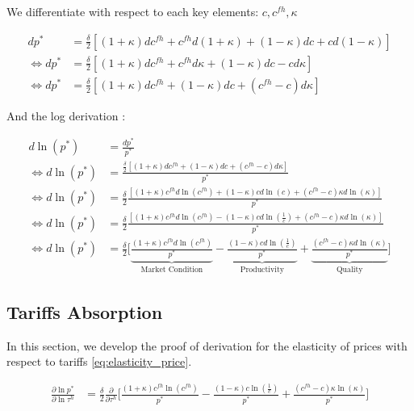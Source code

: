 We differentiate with respect to each key elements: $c, c^{fh}, \kappa$

\begin{align*}
    d p^* &= \frac{\delta}{2}[(1 + \kappa)dc^{fh} + c^{fh}d(1 + \kappa) + (1 - \kappa)dc + cd(1 - \kappa)] \\
    \Longleftrightarrow d p^* &= \frac{\delta}{2}[(1 + \kappa)dc^{fh} + c^{fh}d\kappa + (1 - \kappa)dc - cd\kappa]\\
    \Longleftrightarrow d p^* &= \frac{\delta}{2}[(1 + \kappa)dc^{fh} + (1 - \kappa)dc  + (c^{fh} - c)d\kappa]
\end{align*}

And the log derivation :

\begin{align*}
    d \ln(p^*) &=\frac{dp^*}{p^*} \\
    \Longleftrightarrow d \ln(p^*) &= \frac{\frac{\delta}{2} [(1 + \kappa)dc^{fh} + (1 - \kappa)dc  + (c^{fh} - c)d\kappa]}{p^*} \\
    \Longleftrightarrow d \ln(p^*) &= \frac{\delta}{2}\frac{[(1 + \kappa)c^{fh}d\ln(c^{fh}) + (1 - \kappa)cd\ln(c)  + (c^{fh} - c)\kappa d\ln(\kappa)]}{p^*} \\
    \Longleftrightarrow d \ln(p^*) &= \frac{\delta}{2}\frac{[(1 + \kappa)c^{fh}d\ln(c^{fh}) - (1 - \kappa)cd\ln(\frac{1}{c})  + (c^{fh} - c)\kappa d\ln(\kappa)]}{p^*} \\
     \Longleftrightarrow d \ln(p^*) &= \frac{\delta}{2} \bigg[\underbrace{\frac{(1 + \kappa)c^{fh}d\ln(c^{fh})}{p^*}}_{\text{Market Condition}} - \underbrace{\frac{(1 - \kappa)c d\ln(\frac{1}{c})}{p^*}}_{\text{Productivity}} + \underbrace{\frac{(c^{fh} - c)\kappa d\ln(\kappa)}{p^*}}_{\text{Quality}}\bigg]
\end{align*}

\subsection{Tariffs Absorption} \label{app:tariff}

In this section, we develop the proof of derivation for the elasticity of prices with respect to tariffs \eqref{eq:elasticity_price}.

\begin{align*}
    \frac{\partial \ln p^*}{\partial \ln \tau^h} &= \frac{\delta}{2} \frac{\partial}{\partial \tau^h}\bigg[{\frac{(1 + \kappa)c^{fh}\ln(c^{fh})}{p^*}} - \frac{(1 - \kappa)c\ln(\frac{1}{c})}{p^*} + \frac{(c^{fh} - c)\kappa\ln(\kappa)}{p^*}\bigg] 
\end{align*}

